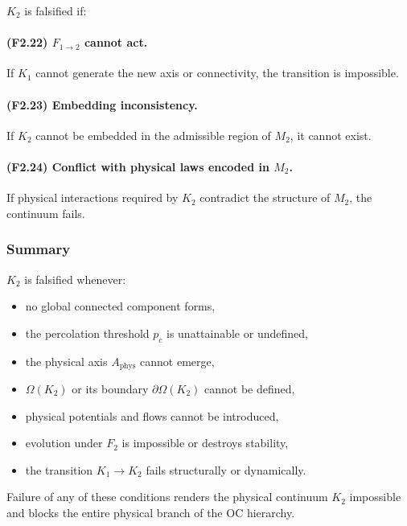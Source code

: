 $K_2$ is falsified if:

\paragraph{(F2.22) $F_{1\to 2}$ cannot act.}
If $K_1$ cannot generate the new axis or connectivity, the transition is
impossible.

\paragraph{(F2.23) Embedding inconsistency.}
If $K_2$ cannot be embedded in the admissible region of $M_2$, it cannot
exist.

\paragraph{(F2.24) Conflict with physical laws encoded in \texorpdfstring{$M_2$}{M_2}.}
If physical interactions required by $K_2$ contradict the structure of
$M_2$, the continuum fails.



\subsubsection{Summary}

$K_2$ is falsified whenever:

\begin{itemize}
    \item no global connected component forms,
    \item the percolation threshold $p_c$ is unattainable or undefined,
    \item the physical axis $A_{\mathrm{phys}}$ cannot emerge,
    \item $\Omega(K_2)$ or its boundary $\partial\Omega(K_2)$ cannot be
    defined,
    \item physical potentials and flows cannot be introduced,
    \item evolution under $F_2$ is impossible or destroys stability,
    \item the transition $K_1\to K_2$ fails structurally or dynamically.
\end{itemize}

Failure of any of these conditions renders the physical continuum
$K_2$ impossible and blocks the entire physical branch of the OC
hierarchy.

